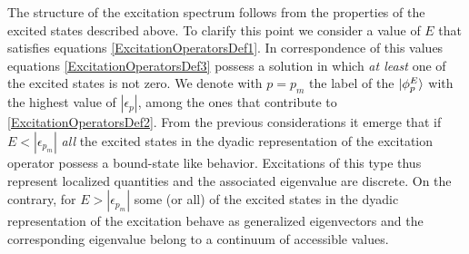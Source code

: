 \documentclass[reprint,aps,prb]{revtex4-1}
\newcommand{\eps}{\epsilon}
\begin{document}
The structure of the excitation spectrum follows from the properties of the excited states described above. To clarify this point we consider a value of $E$ that satisfies equations
\eqref{ExcitationOperatorsDef1}. In correspondence of this values equations \eqref{ExcitationOperatorsDef3} possess a solution in which \emph{at least} one of the excited states 
is not zero. We denote with $p=p_m$ the label of the $\ket{\phi^E_p}$  with the highest value of $|\eps_p|$, among the ones that contribute to \eqref{ExcitationOperatorsDef2}. From the previous 
considerations it emerge that if $E<|\eps_{p_m}|$ \emph{all} the excited states in the dyadic representation of the excitation operator possess a bound-state like behavior. Excitations 
of this type thus represent localized quantities and the associated eigenvalue are discrete. On the contrary, for $E>|\eps_{p_m}|$ some (or all) of the excited states in the dyadic representation
of the excitation behave as generalized eigenvectors and the corresponding eigenvalue belong to a continuum of accessible values.

\end{document}
